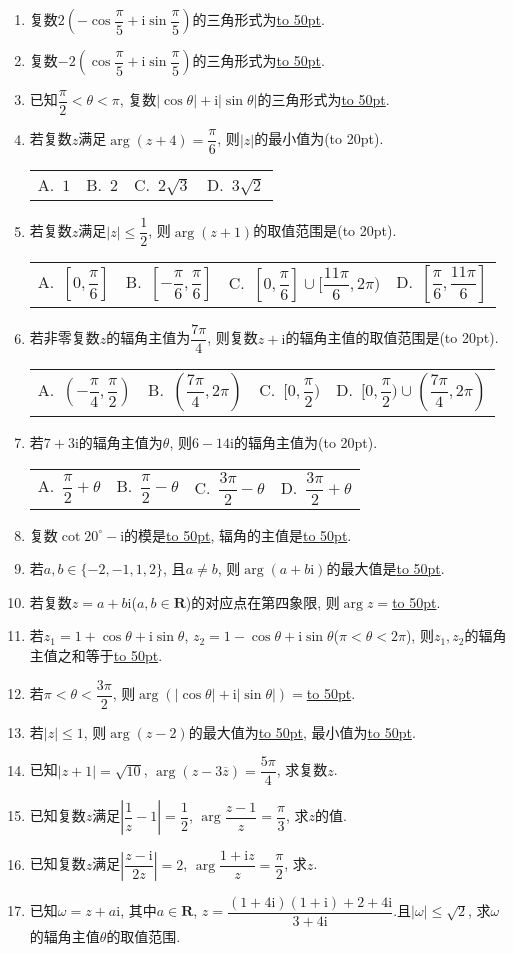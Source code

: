\documentclass[10pt,a4paper]{article}
\newcommand{\blank}[1]{\underline{\hbox to #1pt{}}}
\newcommand{\bracket}[1]{(\hbox to #1pt{})}
\newcommand{\fourch}[4]{\par\begin{tabular}{p{.23\textwidth}p{.23\textwidth}p{.23\textwidth}p{.23\textwidth}}
A.~#1 &B.~#2& C.~#3& D.~#4
\end{tabular}}
\begin{document}
\begin{enumerate}[1.]
\item 复数$2(-\cos \dfrac{\pi }5+\mathrm{i}\sin \dfrac{\pi }5)$的三角形式为\blank{50}.
\item 复数$-2(\cos \dfrac{\pi }5+\mathrm{i}\sin \dfrac{\pi }5)$的三角形式为\blank{50}.
\item 已知$\dfrac{\pi }2<\theta <\pi$, 复数$|\cos \theta|+\mathrm{i}|\sin \theta|$的三角形式为\blank{50}.
\item 若复数$z$满足$\arg (z+4)=\dfrac{\pi }6$, 则$|z|$的最小值为\bracket{20}.
\fourch{$1$}{$2$}{$2\sqrt 3$}{$3\sqrt 2$}
\item 若复数$z$满足$|z|\le \dfrac 12$, 则$\arg (z+1)$的取值范围是\bracket{20}.
\fourch{$[0,\dfrac{\pi }6]$}{$[-\dfrac{\pi }6,\dfrac{\pi }6]$}{$[0,\dfrac{\pi }6]\cup [\dfrac{11\pi }6,2\pi)$}{$[\dfrac{\pi }6,\dfrac{11\pi }6]$}
\item 若非零复数$z$的辐角主值为$\dfrac{7\pi }4$, 则复数$z+\mathrm{i}$的辐角主值的取值范围是\bracket{20}.
\fourch{$(-\dfrac{\pi }4,\dfrac{\pi }2)$}{$(\dfrac{7\pi }4,2\pi)$}{$[0,\dfrac{\pi }2)$}{$[0,\dfrac{\pi }2)\cup (\dfrac{7\pi }4,2\pi)$}
\item 若$7+3\mathrm{i}$的辐角主值为$\theta$, 则$6-14\mathrm{i}$的辐角主值为\bracket{20}.
\fourch{$\dfrac{\pi }2+\theta$}{$\dfrac{\pi }2-\theta$}{$\dfrac{3\pi }2-\theta$}{$\dfrac{3\pi }2+\theta$}
\item 复数$\cot 20^\circ -\mathrm{i}$的模是\blank{50}, 辐角的主值是\blank{50}.
\item 若$a,b\in \{-2,-1,1,2\}$, 且$a\ne b$, 则$\arg (a+b\mathrm{i})$的最大值是\blank{50}.
\item 若复数$z=a+b\mathrm{i}$($a,b\in \mathbf{R}$)的对应点在第四象限, 则$\arg z=$\blank{50}.
\item 若$z_1=1+\cos \theta +\mathrm{i}\sin \theta$, $z_2=1-\cos \theta +\mathrm{i}\sin \theta$($\pi <\theta <2\pi$), 则$z_1,z_2$的辐角主值之和等于\blank{50}.
\item 若$\pi <\theta <\dfrac{3\pi }2$, 则$\arg (|\cos \theta|+\mathrm{i}|\sin \theta|)=$\blank{50}.
\item 若$|z|\le 1$, 则$\arg (z-2)$的最大值为\blank{50}, 最小值为\blank{50}.
\item 已知$|z+1|=\sqrt {10}$, $\arg (z-3\overline z)=\dfrac{5\pi }4$, 求复数$z$.
\item 已知复数$z$满足$|\dfrac 1z-1|=\dfrac 12$, $\arg \dfrac{z-1}z=\dfrac{\pi }3$, 求$z$的值.
\item 已知复数$z$满足$|\dfrac{z-\mathrm{i}}{2z}|=2$, $\arg \dfrac{1+\mathrm{i}z}z=\dfrac{\pi }2$, 求$z$.
\item 已知$\omega =z+a\mathrm{i}$, 其中$a\in \mathbf{R}$, $z=\dfrac{(1+4\mathrm{i})(1+\mathrm{i})+2+4\mathrm{i}}{3+4\mathrm{i}}$.且$|\omega|\le \sqrt 2$, 求$\omega$的辐角主值$\theta$的取值范围.

\end{enumerate}
\end{document}
